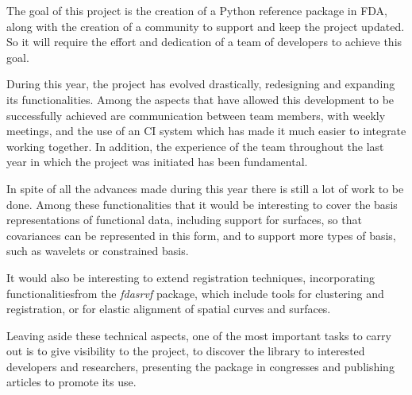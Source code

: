 The goal of this project is the creation of a Python reference package in
FDA, along with the creation of a community to
support and keep the project updated. So it will require the effort and
dedication of a team of developers to achieve this goal.

During this year, the project has evolved drastically, redesigning and expanding
its functionalities.
Among the aspects that have allowed this development to be successfully achieved
are communication between team members, with weekly meetings, and the use of
an CI system which has made it much easier to integrate working together.
In addition, the experience of the team throughout the last year in which the
project was initiated has been fundamental.

In spite of all the advances made during this year there is still a lot of work
to be done.
Among these functionalities that it would be interesting to cover the basis
representations of functional data, including support for surfaces, so that
covariances can be represented in this form, and to support more types of basis,
such as wavelets \cite{wavelets} or constrained basis\cite{Ramsay2005}.

It would also be interesting to extend registration techniques,
incorporating functionalitiesfrom the \textit{fdasrvf}\cite{fdasrvf} package,
which include tools for clustering and registration, or for elastic
alignment of spatial curves and surfaces.

Leaving aside these technical aspects, one of the most important tasks to carry
out is to give visibility to the project, to discover the library to interested
developers and researchers, presenting the package in congresses and publishing
articles to promote its use.
